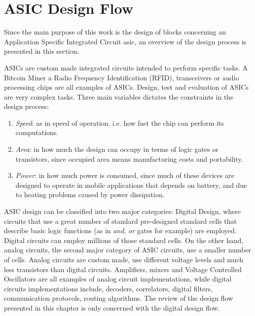 

\chapter{ASIC Design Flow}




Since the main purpose of this work is the design of blocks concerning an Application Specific Integrated Circuit \ac{asic}, an overview of the design process is presented in this section. %

ASICs are custom made integrated circuits intended to perform specific tasks. A Bitcoin Miner a Radio Frequency Identification (RFID), transceivers or audio processing chips are all examples of ASICs. Design, test and evaluation of ASICs are very complex tasks. Three main variables dictates the constraints in the design process: 

\begin{enumerate}
\item \textit{Speed}: as in speed of operation, i.e. how fast the chip can perform its computations.
\item \textit{Area}: in how much the design can occupy in terms of logic gates or transistors, since occupied area means manufacturing costs and portability.
\item \textit{Power}: in how much power is consumed, since much of these devices are designed to operate in mobile applications that depends on battery, and due to heating problems caused by power dissipation. 
\end{enumerate}

 

ASIC design can be classified into two major categories: Digital Design, where circuits that use a great number of standard pre-designed standard cells that describe basic logic functions (as in \emph{and}, \emph{or} gates for example) are employed. Digital circuits can employ millions of those standard cells. On the other hand, analog circuits, the second major category of ASIC circuits, use a smaller number of cells. Analog circuits are custom made, use different voltage levels and much less transistors than digital circuits. Amplifiers, mixers and Voltage Controlled Oscillators are all examples of analog circuit implementations, while digital circuits implementations include, decoders, correlators, digital filters, communication protocols, routing algorithms. The review of the design flow presented in this chapter is only concerned with the digital design flow. 

